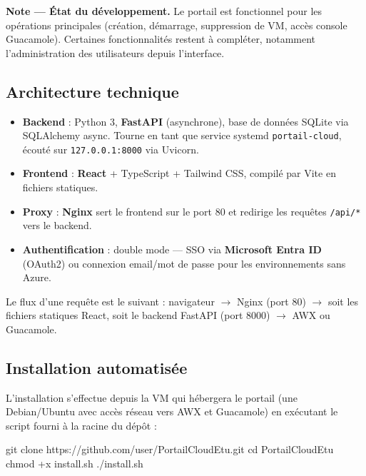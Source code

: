 \documentclass[a4paper]{article}
\newcommand{\cmd}[1]{\texttt{#1}}
\begin{document}
\begin{infobox}
  \textbf{Note --- État du développement.} Le portail est fonctionnel pour les opérations principales (création, démarrage, suppression de VM, accès console Guacamole). Certaines fonctionnalités restent à compléter, notamment l'administration des utilisateurs depuis l'interface.
\end{infobox}

\subsection{Architecture technique}

\begin{itemize}
  \item \textbf{Backend} : Python 3, \textbf{FastAPI} (asynchrone), base de données SQLite via SQLAlchemy async. Tourne en tant que service systemd \cmd{portail-cloud}, écouté sur \cmd{127.0.0.1:8000} via Uvicorn.
  \item \textbf{Frontend} : \textbf{React} + TypeScript + Tailwind CSS, compilé par Vite en fichiers statiques.
  \item \textbf{Proxy} : \textbf{Nginx} sert le frontend sur le port 80 et redirige les requêtes \cmd{/api/*} vers le backend.
  \item \textbf{Authentification} : double mode --- SSO via \textbf{Microsoft Entra ID} (OAuth2) ou connexion email/mot de passe pour les environnements sans Azure.
\end{itemize}

Le flux d'une requête est le suivant : navigateur \(\to\) Nginx (port 80) \(\to\) soit les fichiers statiques React, soit le backend FastAPI (port 8000) \(\to\) AWX ou Guacamole.

\subsection{Installation automatisée}

L'installation s'effectue depuis la VM qui hébergera le portail (une Debian/Ubuntu avec accès réseau vers AWX et Guacamole) en exécutant le script fourni à la racine du dépôt :

\begin{bashcode}
git clone https://github.com/user/PortailCloudEtu.git
cd PortailCloudEtu
chmod +x install.sh
./install.sh
\end{bashcode}
\end{document}
